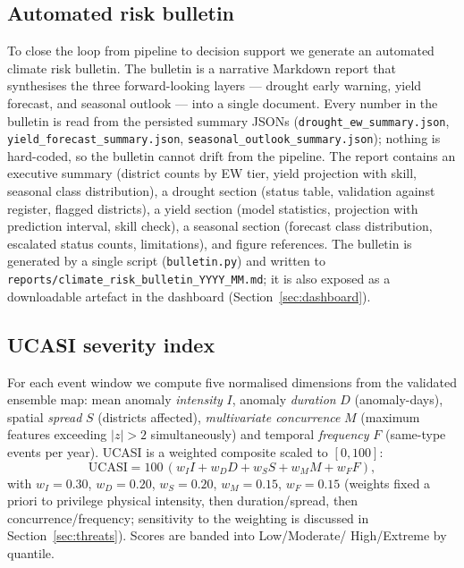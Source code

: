 \documentclass[preprint,12pt]{elsarticle}
\begin{document}
\subsection{Automated risk bulletin}\label{sec:bulletin}
To close the loop from pipeline to decision support we generate an automated
climate risk bulletin. The bulletin is a narrative Markdown report that
synthesises the three forward-looking layers --- drought early warning, yield
forecast, and seasonal outlook --- into a single document. Every number in the
bulletin is read from the persisted summary JSONs
(\texttt{drought\_ew\_summary.json}, \texttt{yield\_forecast\_summary.json},
\texttt{seasonal\_outlook\_summary.json}); nothing is hard-coded, so the bulletin
cannot drift from the pipeline. The report contains an executive summary
(district counts by EW tier, yield projection with skill, seasonal class
distribution), a drought section (status table, validation against register,
flagged districts), a yield section (model statistics, projection with
prediction interval, skill check), a seasonal section (forecast class
distribution, escalated status counts, limitations), and figure references. The
bulletin is generated by a single script (\texttt{bulletin.py}) and written to
\texttt{reports/climate\_risk\_bulletin\_YYYY\_MM.md}; it is also exposed as a
downloadable artefact in the dashboard
(Section~\ref{sec:dashboard}).

\subsection{UCASI severity index}\label{sec:ucasi}
For each event window we compute five normalised dimensions from the validated
ensemble map: mean anomaly \emph{intensity} $I$, anomaly \emph{duration} $D$
(anomaly-days), spatial \emph{spread} $S$ (districts affected), \emph{multivariate
concurrence} $M$ (maximum features exceeding $|z|>2$ simultaneously) and temporal
\emph{frequency} $F$ (same-type events per year). UCASI is a weighted composite
scaled to $[0,100]$:
\begin{equation}
\mathrm{UCASI} = 100\,(w_I I + w_D D + w_S S + w_M M + w_F F),
\end{equation}
with $w_I{=}0.30$, $w_D{=}0.20$, $w_S{=}0.20$, $w_M{=}0.15$, $w_F{=}0.15$
(weights fixed a priori to privilege physical intensity, then
duration/spread, then concurrence/frequency; sensitivity to the weighting is
discussed in Section~\ref{sec:threats}). Scores are banded into Low/Moderate/
High/Extreme by quantile.
\end{document}
